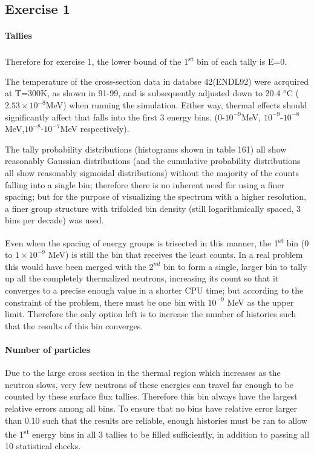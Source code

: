 \documentclass[a4paper, 11pt]{article}
\begin{document}
\subsection{Exercise 1}
\paragraph{Tallies\indent}
Therefore for exercise 1, the lower bound of the 1\textsuperscript{st} bin of each tally is E=0.

The temperature of the cross-section data in databse 42(ENDL92) were acrquired at T=300K, as shown in 91-99, and is subsequently adjusted down to 20.4 ${}^{o}$C ($2.53 \times 10^{-8}$MeV) when running the simulation. Either way, thermal effects should significantly affect that falls into the first 3 energy bins. ($0$-$10^{-9}$MeV, $10^{-9}$-$10^{-8}$MeV,$10^{-8}$-$10^{-7}$MeV respectively).

The tally probability distributions (histograms shown in table 161) all show reasonably Gaussian distributions (and the cumulative probability distributions all show reasonably sigmoidal distributions) without the majority of the counts falling into a single bin; therefore there is no inherent need for using a finer spacing; but for the purpose of visualizing the spectrum with a higher resolution, a finer group structure with trifolded bin density (still logarithmically spaced, 3 bins per decade) was used.

Even when the spacing of energy groups is trisected in this manner, the 1\textsuperscript{st} bin ($0$ to $1\times 10^{-9}$ MeV) is still the bin that receives the least counts. In a real problem this would have been merged with the $2^{nd}$ bin to form a single, larger bin to tally up all the completely thermalized neutrons, increasing its count so that it converges to a precise enough value in a shorter CPU time; but according to the constraint of the problem, there must be one bin with ${10^{-9}}$ MeV as the upper limit. Therefore the only option left is to increase the number of histories such that the results of this bin converges.

\paragraph{Number of particles}
Due to the large cross section in the thermal region which increases as the neutron slows, very few neutrons of these energies can travel far enough to be counted by these surface flux tallies. Therefore this bin always have the largest relative errors among all bins. To ensure that no bins have relative error larger than 0.10 such that the results are reliable, enough histories must be ran to allow the 1\textsuperscript{st} energy bins in all 3 tallies to be filled sufficiently, in addition to passing all 10 statistical checks.
\end{document}
